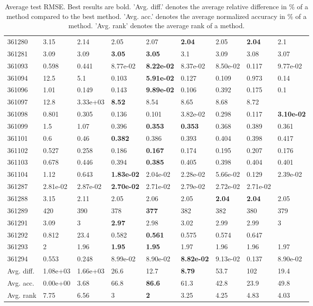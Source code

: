 \begin{table}[ht!]
\begin{tabular}{lllllllll}
  361280 & 3.15 & 2.14 & 2.05 & 2.07 & \textbf{2.04} & 2.05 & \textbf{2.04} & 2.1 \\ 
  361281 & 3.09 & 3.09 & \textbf{3.05} & \textbf{3.05} & 3.1 & 3.09 & 3.08 & 3.07 \\ 
  361093 & 0.598 & 0.441 & 8.77e-02 & \textbf{8.22e-02} & 8.37e-02 & 8.50e-02 & 0.117 & 9.77e-02 \\ 
  361094 & 12.5 & 5.1 & 0.103 & \textbf{5.91e-02} & 0.127 & 0.109 & 0.973 & 0.14 \\ 
  361096 & 1.01 & 0.149 & 0.143 & \textbf{9.89e-02} & 0.106 & 0.392 & 0.175 & 0.1 \\ 
  361097 & 12.8 & 3.33e+03 & \textbf{8.52} & 8.54 & 8.65 & 8.68 & 8.72 &  \\ 
  361098 & 0.801 & 0.305 & 0.136 & 0.101 & 3.82e-02 & 0.298 & 0.117 & \textbf{3.10e-02} \\ 
  361099 & 1.5 & 1.07 & 0.396 & \textbf{0.353} & \textbf{0.353} & 0.368 & 0.389 & 0.361 \\ 
  361101 & 0.6 & 0.46 & \textbf{0.382} & 0.386 & 0.393 & 0.404 & 0.398 & 0.417 \\ 
  361102 & 0.527 & 0.258 & 0.186 & \textbf{0.167} & 0.174 & 0.195 & 0.207 & 0.176 \\ 
  361103 & 0.678 & 0.446 & 0.394 & \textbf{0.385} & 0.405 & 0.398 & 0.404 & 0.401 \\ 
  361104 & 1.12 & 0.643 & \textbf{1.83e-02} & 2.04e-02 & 2.28e-02 & 5.66e-02 & 0.129 & 2.39e-02 \\ 
  361287 & 2.81e-02 & 2.87e-02 & \textbf{2.70e-02} & 2.71e-02 & 2.79e-02 & 2.72e-02 & 2.71e-02 &  \\ 
  361288 & 3.15 & 2.11 & 2.05 & 2.06 & 2.05 & \textbf{2.04} & \textbf{2.04} & 2.05 \\ 
  361289 & 420 & 390 & 378 & \textbf{377} & 382 & 382 & 380 & 379 \\ 
  361291 & 3.09 & 3 & \textbf{2.97} & 2.98 & 3.02 & 2.99 & 2.99 & 3 \\ 
  361292 & 0.812 & 23.4 & 0.582 & \textbf{0.561} & 0.575 & 0.574 & 0.647 &  \\ 
  361293 & 2 & 1.96 & \textbf{1.95} & \textbf{1.95} & 1.97 & 1.96 & 1.96 & 1.97 \\ 
  361294 & 0.553 & 0.248 & 8.99e-02 & 8.90e-02 & \textbf{8.82e-02} & 9.13e-02 & 0.137 & 8.90e-02 \\ 
   \hline
Avg. diff. & 1.08e+03 & 1.66e+03 & 26.6 & 12.7 & \textbf{8.79} & 53.7 & 102 & 19.4 \\ 
  Avg. acc. & 0.00e+00 & 3.68 & 66.8 & \textbf{86.6} & 61.3 & 42.8 & 23.9 & 49.8 \\ 
  Avg. rank & 7.75 & 6.56 & 3 & \textbf{2} & 3.25 & 4.25 & 4.83 & 4.03 \\ 
   \hline
\hline
\end{tabular}
\endgroup
\caption{Average test RMSE. 
                  Best results are bold. 
                  'Avg. diff.' denotes the average relative difference in \% of a method compared to the best method.
                  'Avg. acc.' denotes the average normalized accuracy in \% of a method.
                  'Avg. rank' denotes the average rank of a method.} 
\label{TABLES/table_results_RMSE_random_splits}
\end{table}
